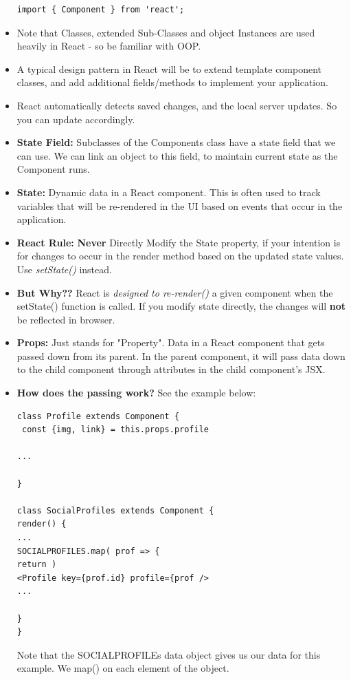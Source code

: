 \documentclass[8pt,a4paper]{extarticle}
\begin{document}
\begin{itemize}
\begin{verbatim}
import { Component } from 'react';
\end{verbatim}

\item Note that Classes, extended Sub-Classes and object Instances are used heavily in React - so be familiar with OOP.
\item A typical design pattern in React will be to extend template component classes, and add additional fields/methods to implement your application.
\item React automatically detects saved changes, and the local server updates. So you can update accordingly.
\item \textbf{State Field:} Subclasses of the Components class have a state field that we can use. We can link an object to this field, to maintain current state as the Component runs.
\item \textbf{State:} Dynamic data in a React component. This is often used to track variables that will be re-rendered in the UI based on events that occur in the application.
\item \textbf{React Rule:} \textbf{Never} Directly Modify the State property, if your intention is for changes to occur in the render method based on the updated state values. Use \textit{setState()} instead.
\item \textbf{But Why??} React is \textit{designed to re-render()} a given component when the setState() function is called. If you modify state directly, the changes will \textbf{not} be reflected in browser.
\item \textbf{Props:} Just stands for "Property". Data in a React component that gets passed down from its parent. In the parent component, it will pass data down to the child component through attributes in the child component’s JSX.
\item \textbf{How does the passing work?} See the example below:

\begin{verbatim}
class Profile extends Component {
 const {img, link} = this.props.profile

...

}

class SocialProfiles extends Component {
render() {
...
SOCIALPROFILES.map( prof => {
return )
<Profile key={prof.id} profile={prof />
...

}
}
\end{verbatim}

Note that the SOCIALPROFILEs data object gives us our data for this example. We map() on each element of the object.


\end{itemize}
\end{document}
